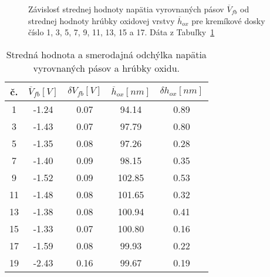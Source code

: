 \newpage
\begin{figure}[h!]\centering
  \begin{minipage}[c]{\myfiguresize}
    \begin{center}
      
    \end{center}
    \caption[Závislosť strednej hodnoty $\overline V_{fb}$ od strednej
      hodnoty hrúbky oxidovej vrstvy $\overline h_{ox}$]{Závislosť
      strednej hodnoty napätia vyrovnaných pásov $\overline V_{fb}$ od
      strednej hodnoty hrúbky oxidovej vrstvy $\overline h_{ox}$ pre
      kremíkové dosky číslo 1, 3, 5, 7, 9, 11, 13, 15 a 17. Dáta z
      Tabuľky~\ref{tab:7.4}}\label{fig:7.6}
  \end{minipage}
\end{figure}

\begin{table}[h!]\centering
  \begin{minipage}[c]{\myfiguresize}
    \begin{center}
      \begin{tabular}{c c c c c}
        č. & $\overline V_{fb} [V]$ & $\delta V_{fb} [V]$ & $\overline h_{ox} [nm]$ & $\delta h_{ox} [nm]$\\ 
        \hline
         1 & -1.24 & 0.07 &  94.14 & 0.89\\
         3 & -1.43 & 0.07 &  97.79 & 0.80\\
         5 & -1.35 & 0.08 &  97.26 & 0.28\\
         7 & -1.40 & 0.09 &  98.15 & 0.35\\
         9 & -1.52 & 0.09 & 102.85 & 0.53\\
        11 & -1.48 & 0.08 & 101.65 & 0.32\\
        13 & -1.38 & 0.08 & 100.94 & 0.41\\
        15 & -1.33 & 0.07 & 100.80 & 0.16\\
        17 & -1.59 & 0.08 &  99.93 & 0.22\\
        19 & -2.43 & 0.16 &  99.67 & 0.19\\
      \end{tabular}
    \end{center}
    \caption[Stredná hodnota a smerodajná odchýlka napätia vyrovnaných
      pásov a hrúbky oxidu]{Stredná hodnota a smerodajná odchýlka
      napätia vyrovnaných pásov a hrúbky oxidu.}\label{tab:7.4}
  \end{minipage}
\end{table}

